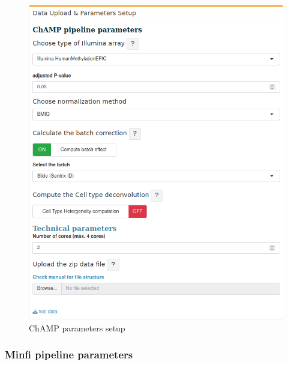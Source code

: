 \documentclass[
  a4paper,
  oneside,
  open=any]{scrreport}
\begin{document}
\begin{figure}[H]

{\centering \includegraphics{./_images/methylysis_02.png}

}

\caption{ChAMP parameters setup}

\end{figure}

\hypertarget{minfi-pipeline-parameters}{%
\subsubsection{\texorpdfstring{\textbf{Minfi pipeline
parameters}}{Minfi pipeline parameters}}\label{minfi-pipeline-parameters}}
\end{document}
